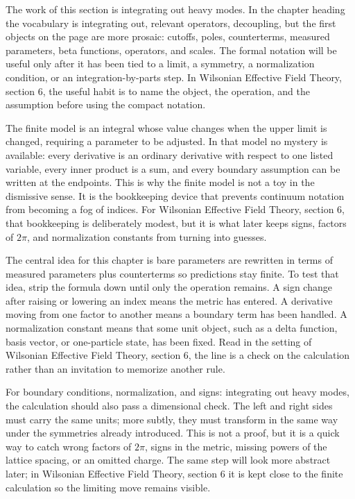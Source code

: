 The work of this section is integrating out heavy modes.  In the chapter heading the vocabulary is integrating out, relevant operators, decoupling, but the first objects on the page are more prosaic: cutoffs, poles, counterterms, measured parameters, beta functions, operators, and scales.  The formal notation will be useful only after it has been tied to a limit, a symmetry, a normalization condition, or an integration-by-parts step.  In Wilsonian Effective Field Theory, section 6, the useful habit is to name the object, the operation, and the assumption before using the compact notation.

The finite model is an integral whose value changes when the upper limit is changed, requiring a parameter to be adjusted.  In that model no mystery is available: every derivative is an ordinary derivative with respect to one listed variable, every inner product is a sum, and every boundary assumption can be written at the endpoints.  This is why the finite model is not a toy in the dismissive sense.  It is the bookkeeping device that prevents continuum notation from becoming a fog of indices.  For Wilsonian Effective Field Theory, section 6, that bookkeeping is deliberately modest, but it is what later keeps signs, factors of \(2\pi\), and normalization constants from turning into guesses.

The central idea for this chapter is bare parameters are rewritten in terms of measured parameters plus counterterms so predictions stay finite.  To test that idea, strip the formula down until only the operation remains.  A sign change after raising or lowering an index means the metric has entered.  A derivative moving from one factor to another means a boundary term has been handled.  A normalization constant means that some unit object, such as a delta function, basis vector, or one-particle state, has been fixed.  Read in the setting of Wilsonian Effective Field Theory, section 6, the line is a check on the calculation rather than an invitation to memorize another rule.

For boundary conditions, normalization, and signs: integrating out heavy modes, the calculation should also pass a dimensional check.  The left and right sides must carry the same units; more subtly, they must transform in the same way under the symmetries already introduced.  This is not a proof, but it is a quick way to catch wrong factors of \(2\pi\), signs in the metric, missing powers of the lattice spacing, or an omitted charge.  The same step will look more abstract later; in Wilsonian Effective Field Theory, section 6 it is kept close to the finite calculation so the limiting move remains visible.

